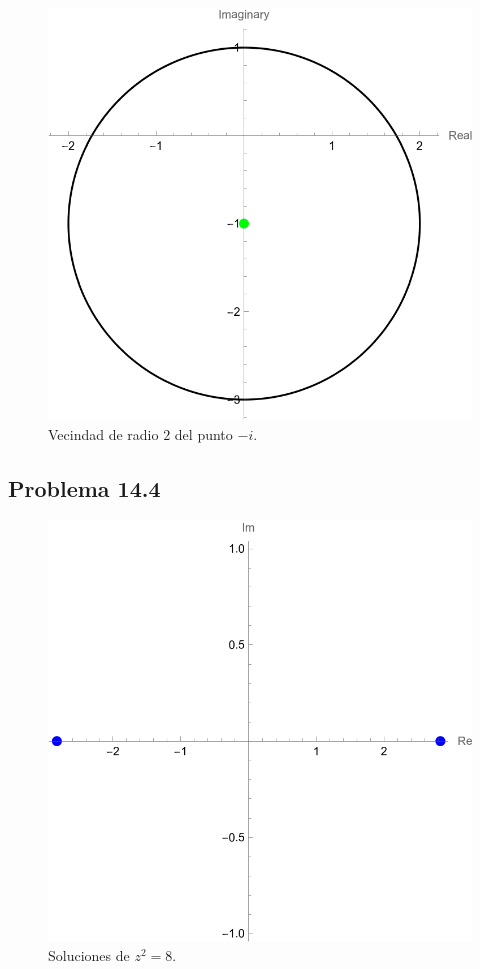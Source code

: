 \documentclass[conference]{IEEEtran}
\begin{document}
\begin{figure}[H]
	\centering
	\includegraphics[scale=0.4]{./img/p14-3_b}
	\caption{Vecindad de radio $2$ del punto $-i$.}
\end{figure}


\subsection{Problema 14.4}
\begin{figure}[H]
	\centering
	\includegraphics[scale=0.4]{./img/p14-4_a}
	\caption{Soluciones de $z^2 = 8$.}
\end{figure}
\end{document}
